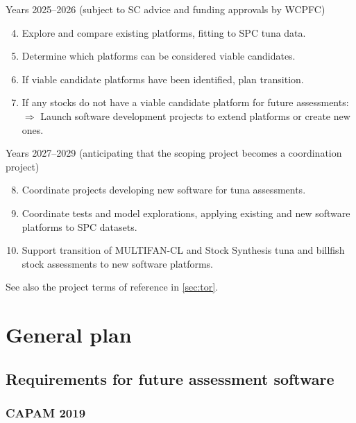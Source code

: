 \documentclass{SCreport}
\begin{document}
Years 2025--2026 (subject to SC advice and funding approvals by WCPFC)

\begin{enumerate}\setcounter{enumi}{3}
  \item Explore and compare existing platforms, fitting to SPC tuna
  data.\\[-4.5ex]
  \item Determine which platforms can be considered viable candidates.\\[-4.5ex]
  \item If viable candidate platforms have been identified, plan
  transition.\\[-4.5ex]
  \item If any stocks do not have a viable candidate platform for future
  assessments:\\
  $\Rightarrow$ Launch software development projects to extend platforms or
  create new ones.
\end{enumerate}

Years 2027--2029 (anticipating that the scoping project becomes a coordination
project)

\begin{enumerate}\setcounter{enumi}{7}
  \item Coordinate projects developing new software for tuna
  assessments.\\[-4.5ex]
  \item Coordinate tests and model explorations, applying existing and new
  software\\ platforms to SPC datasets.\\[-4.5ex]
  \item Support transition of MULTIFAN-CL and Stock Synthesis tuna and
  billfish\\
  stock assessments to new software platforms.
\end{enumerate}

See also the project terms of reference in \autoref{sec:tor}.

\section{General plan}

\subsection{Requirements for future assessment software}

\subsubsection{CAPAM 2019}
\end{document}
